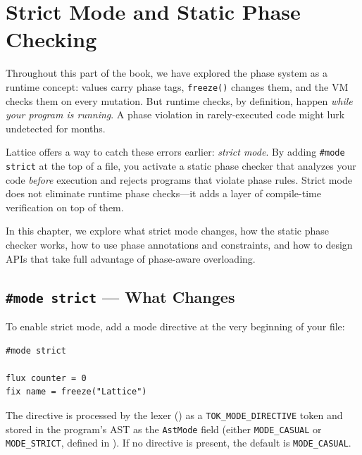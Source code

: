 \chapter{Strict Mode and Static Phase Checking}\label{ch:strict-mode}


Throughout this part of the book, we have explored the phase system as a runtime concept: values carry phase tags, \lstinline|freeze()| changes them, and the VM checks them on every mutation.
But runtime checks, by definition, happen \emph{while your program is running}.
A phase violation in rarely-executed code might lurk undetected for months.

Lattice offers a way to catch these errors earlier: \emph{strict mode}.
By adding \lstinline|#mode strict| at the top of a file, you activate a static phase checker that analyzes your code \emph{before} execution and rejects programs that violate phase rules.
Strict mode does not eliminate runtime phase checks---it adds a layer of compile-time verification on top of them.

In this chapter, we explore what strict mode changes, how the static phase checker works, how to use phase annotations and constraints, and how to design APIs that take full advantage of phase-aware overloading.

\section{\texttt{\#mode strict} --- What Changes}\label{sec:mode-strict}


To enable strict mode, add a mode directive at the very beginning of your file:

\begin{lstlisting}[language=Lattice, caption={Enabling strict mode}]
#mode strict

flux counter = 0
fix name = freeze("Lattice")
\end{lstlisting}

The directive is processed by the lexer () as a \lstinline|TOK_MODE_DIRECTIVE| token and stored in the program's AST as the \lstinline|AstMode| field (either \lstinline|MODE_CASUAL| or \lstinline|MODE_STRICT|, defined in ).
If no directive is present, the default is \lstinline|MODE_CASUAL|.

